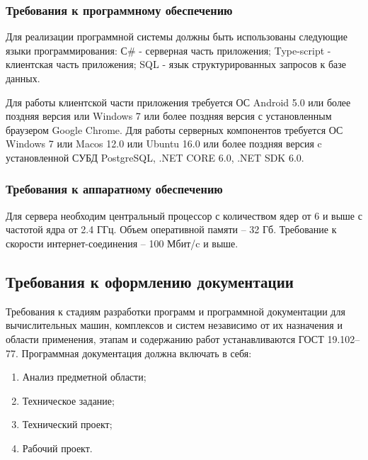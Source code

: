 \subsubsection{Требования к программному обеспечению}
Для реализации программной системы должны быть использованы следующие языки программирования:
С\# -\- серверная часть приложения;
Type-script -\- клиентская часть приложения;
SQL -\- язык структурированных запросов к базе данных.

Для работы клиентской части приложения требуется ОС Android 5.0 или более поздняя версия или Windows 7 или более поздняя версия с установленным браузером Google Chrome.
Для работы серверных компонентов требуется ОС Windows 7 или Macos 12.0 или Ubuntu 16.0 или более поздняя версия c установленной СУБД PostgreSQL, .NET CORE 6.0, .NET SDK 6.0.

\subsubsection{Требования к аппаратному обеспечению}
Для сервера необходим центральный процессор с количеством ядер от 6 и выше с частотой ядра от 2.4 ГГц. Объем оперативной памяти – 32 Гб. Требование к скорости интернет-соединения – 100 Мбит/c и выше.

\subsection{Требования к оформлению документации}
Требования к стадиям разработки программ и программной документации для вычислительных машин, комплексов и систем независимо от их назначения и области применения, этапам и содержанию работ устанавливаются ГОСТ 19.102–77.
Программная документация должна включать в себя:

\begin{enumerate}
\item Анализ предметной области;
\item Техническое задание;
\item Технический проект;
\item Рабочий проект.
\end{enumerate}

